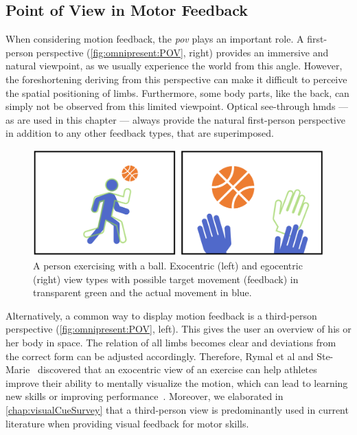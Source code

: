 \subsection{Point of View in Motor Feedback\label{sec:omnipresent:POV}}
When considering motion feedback, the \emph{\acrshort{pov}} plays an important role. A first-person perspective (\autoref{fig:omnipresent:POV}, right) provides an immersive and natural viewpoint, as we usually experience the world from this angle. However, the foreshortening deriving from this perspective can make it difficult to perceive the spatial positioning of limbs. Furthermore, some body parts, like the back, can simply not be observed from this limited viewpoint. 
Optical see-through \acrshort{hmd}s --- as are used in this chapter --- always provide the natural first-person perspective in addition to any other feedback types, that are superimposed.

\begin{figure}[h!]
	\centering
	\includegraphics[width=\linewidth]{pictures/PointOfView.PNG}
	\caption[Comparison of an exocentric and egocentric perspective.]{A person exercising with a ball. Exocentric (left) and egocentric (right) view types with possible target movement (feedback) in transparent green and the actual movement in blue.\label{fig:omnipresent:POV}}
\end{figure}

Alternatively, a common way to display motion feedback is a third-person perspective (\autoref{fig:omnipresent:POV}, left). This gives the user an overview of his or her body in space. The relation of all limbs becomes clear and deviations from the correct form can be adjusted accordingly. Therefore, Rymal et al and Ste-Marie~\cite{rymal2009dsm} discovered that an exocentric view of an exercise can help athletes improve their ability to mentally visualize the motion, which can lead to learning new skills or improving performance~\cite{white1998ida}. Moreover, we elaborated in \autoref{chap:visualCueSurvey} that a third-person view is predominantly used in current literature when providing visual feedback for motor skills.

